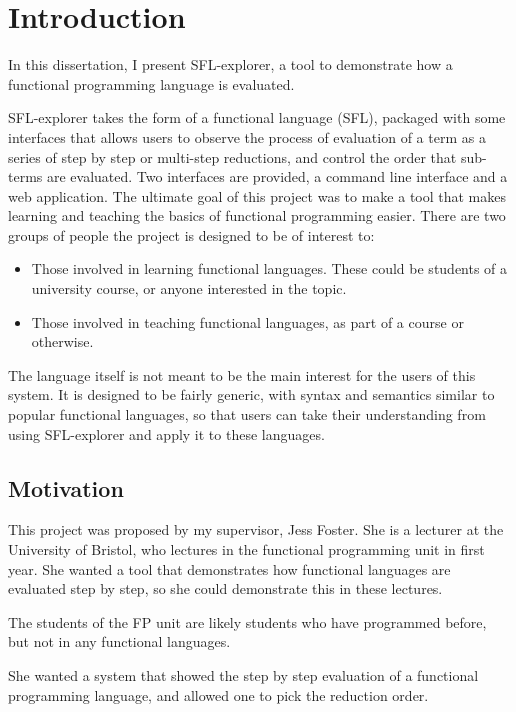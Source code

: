 \chapter{Introduction}
\label{chap:context}

In this dissertation, I present SFL-explorer, a tool to demonstrate how a functional programming language is evaluated.

SFL-explorer takes the form of a functional language (SFL), packaged with some interfaces that allows users to observe the process of evaluation of a term as a series of step by step or multi-step reductions, and control the order that sub-terms are evaluated. Two interfaces are provided, a command line interface and a web application. The ultimate goal of this project was to make a tool that makes learning and teaching the basics of functional programming easier. There are two groups of people the project is designed to be of interest to:
\begin{itemize}
    \item Those involved in learning functional languages. These could be students of a university course, or anyone interested in the topic. 
    \item Those involved in teaching functional languages, as part of a course or otherwise.
\end{itemize}

The language itself is not meant to be the main interest for the users of this system. It is designed to be fairly generic, with syntax and semantics similar to popular functional languages, so that users can take their understanding from using SFL-explorer and apply it to these languages. 

\section{Motivation}
This project was proposed by my supervisor, Jess Foster. She is a lecturer at the University of Bristol, who lectures in the functional programming unit in first year. She wanted a tool that demonstrates how functional languages are evaluated step by step, so she could demonstrate this in these lectures.

The students of the FP unit are likely students who have programmed before, but not in any functional languages. 

She wanted a system that showed the step by step evaluation of a functional programming language, and allowed one to pick the reduction order. 